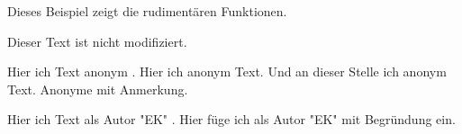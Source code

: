 \documentclass{article}
\begin{document}
 Dieses Beispiel zeigt die rudiment\"aren Funktionen.

 \listofchanges

 Dieser Text ist nicht modifiziert.

 Hier  ich Text anonym .
 Hier  ich anonym Text.
 Und an dieser Stelle  ich anonym Text.
 Anonyme  mit Anmerkung.

 Hier  ich Text als Autor "EK" .
 Hier f\"uge ich 
 als Autor "EK" mit Begr\"undung ein.
\end{document}
